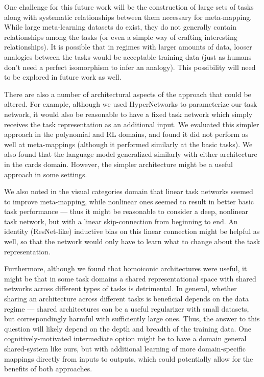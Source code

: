 One challenge for this future work will be the construction of large sets of tasks along with systematic relationships between them necessary for meta-mapping. While large meta-learning datasets do exist, they do not generally contain relationships among the tasks (or even a simple way of crafting interesting relationships). It is possible that in regimes with larger amounts of data, looser analogies between the tasks would be acceptable training data (just as humans don't need a perfect isomorphism to infer an analogy). This possibility will need to be explored in future work as well. \par

There are also a number of architectural aspects of the approach that could be altered. For example, although we used HyperNetworks to parameterize our task network, it would also be reasonable to have a fixed task network which simply receives the task representation as an additional input. We evaluated this simpler approach in the polynomial and RL domains, and found it did not perform as well at meta-mappings (although it performed similarly at the basic tasks). We also found that the language model generalized similarly with either architecture in the cards domain. However, the simpler architecture might be a useful approach in some settings.\par 

We also noted in the visual categories domain that linear task networks seemed to improve meta-mapping, while nonlinear ones seemed to result in better basic task performance --- thus it might be reasonable to consider a deep, nonlinear task network, but with a linear skip-connection from beginning to end. An identity (ResNet-like) inductive bias on this linear connection might be helpful as well, so that the network would only have to learn what to change about the task representation. \par 

Furthermore, although we found that homoiconic architectures were useful, it might be that in some task domains a shared representational space with shared networks across different types of tasks is detrimental. In general, whether sharing an architecture across different tasks is beneficial depends on the data regime --- shared architectures can be a useful regularizer with small datasets, but correspondingly harmful with sufficiently large ones. Thus, the answer to this question will likely depend on the depth and breadth of the training data. One cognitively-motivated intermediate option might be to have a domain general shared-system like ours, but with additional learning of more domain-specific mappings directly from inputs to outputs, which could potentially allow for the benefits of both approaches.\par

